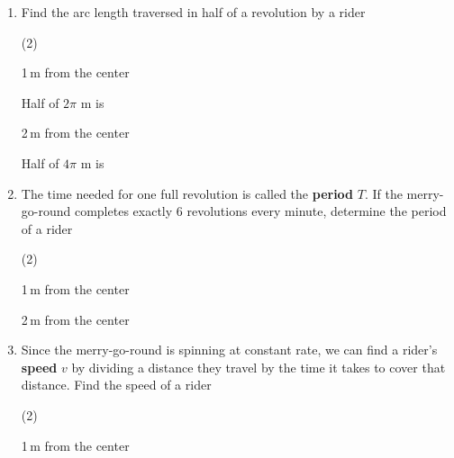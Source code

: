 \documentclass[main]{subfiles}
\begin{document}
\begin{enumerate}
\begin{enumerate}[start=2]
    \item 
    Find the arc length traversed in half of a revolution by a rider
    \begin{tasks}[before-skip=0pt,label=\roman*.](2)
    \task
    \begin{problem}
        1\,m from the center 
    \end{problem}

    \begin{solution}
        Half of $2\pi$ m is 
    \end{solution}
    
    \task
    \begin{problem}
        2\,m from the center
    \end{problem}

    \begin{solution}
        Half of $4\pi$ m is 
    \end{solution}
    \end{tasks}
    


\item 
\begin{problem}
The time needed for one full revolution is called the \textbf{period} $T$.  If the merry-go-round completes exactly 6 revolutions every minute, determine the period of a rider
\end{problem}
    \begin{tasks}[before-skip=0pt,label=\roman*.](2)
    \task
    \begin{problem}
        1\,m from the center 
    \end{problem}

    \begin{solution}
    \end{solution}
    
    \task
    \begin{problem}
        2\,m from the center
    \end{problem}

    \begin{solution}
    \end{solution}
    \end{tasks}

\item 
\begin{problem}
Since the merry-go-round is spinning at constant rate, we can find a rider's \textbf{speed} $v$ by dividing a distance they travel by the time it takes to cover that distance. Find the speed of a rider
\end{problem}
    \begin{tasks}[before-skip=0pt,label=\roman*.](2)
    \task
    \begin{problem}
        1\,m from the center 
    \end{problem}


\end{tasks}
\end{enumerate}
\end{enumerate}
\end{document}
